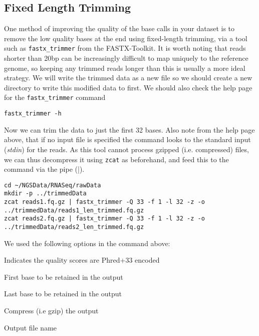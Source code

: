 \subsection{Fixed Length Trimming}
One method of improving the quality of the base calls in your dataset is to remove the low quality bases at the end using fixed-length trimming, via a tool such as \texttt{fastx\_trimmer} from the FASTX-Toolkit.
It is worth noting that reads shorter than 20bp can be increasingly difficult to map uniquely to the reference genome, so keeping any trimmed reads longer than this is usually a more ideal strategy.
We will write the trimmed data as a new file so we should create a new directory to write this modified data to first.
We should also check the help page for the \texttt{fastx\_trimmer} command
\begin{steps}
\begin{lstlisting}
fastx_trimmer -h
\end{lstlisting}
\end{steps}

\begin{steps}
Now we can trim the data to just the first 32 bases.
Also note from the help page above, that if no input file is specified the command looks to the standard input (\textit{stdin}) for the reads.
As this tool cannot process gzipped (i.e. compressed) files, we can thus decompress it using \texttt{zcat} as beforehand, and feed this to the command via the pipe (|).
\end{steps}

\begin{lstlisting}
cd ~/NGSData/RNASeq/rawData
mkdir -p ../trimmedData
zcat reads1.fq.gz | fastx_trimmer -Q 33 -f 1 -l 32 -z -o ../trimmedData/reads1_len_trimmed.fq.gz
zcat reads2.fq.gz | fastx_trimmer -Q 33 -f 1 -l 32 -z -o ../trimmedData/reads2_len_trimmed.fq.gz
\end{lstlisting}

\begin{note}
We used the following options in the command above:
\begin{description}[style=multiline,labelindent=0cm,align=right,leftmargin=0.8\descriptionlabelspace,rightmargin=1.5cm,font=\ttfamily]
\item[-Q 33] Indicates the quality scores are Phred+33 encoded
\item[-f 1] First base to be retained in the output
\item[-l 32] Last base to be retained in the output
\item[-z] Compress (i.e gzip) the output
\item[-o] Output file name
\end{description}
\end{note}

